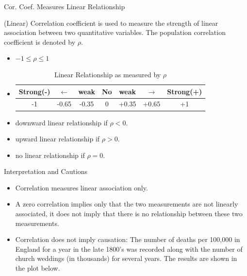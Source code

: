 \documentclass[14pt]{beamer}\usepackage[]{graphicx}\usepackage[]{color}
\begin{document}
\begin{frame}[fragile]{Cor. Coef. Measures Linear Relationship}

(Linear) Correlation coefficient is used to measure the strength of linear  association between two quantitative variables. The population correlation  coefficient is denoted by $\rho$.

\begin{itemize}
\item<1-> $ -1 \le \rho \le 1 $
\item<2-> 

\begin{table}[ht]
{\footnotesize{
\caption{Linear Relationship as measured by $\rho$}
\begin{tabular}{@{} ccccccc @{}} \hline
Strong(-) & $\leftarrow$ & weak & No & weak & $\rightarrow$ & Strong(+) \\ \hline
-1 & -0.65 & -0.35 & 0 & +0.35 & +0.65 & +1 \\ \hline
\end{tabular}
}}
\end{table}

\item<3-> downward linear relationship if $\rho < 0$.
\item<4-> upward linear relationship if $\rho > 0$. 
\item<5-> no linear relationship if $\rho = 0$. 
\end{itemize}
\end{frame}

\begin{frame}[fragile]{Interpretation and Cautions}

\begin{itemize}
\item<1-> Correlation measures linear association only.
\item<2-> A zero correlation implies only that the two measurements are not  linearly associated, it does not imply that there is no relationship  between these two measurements.
\item<3> Correlation does not imply causation: The number of deaths per  100,000 in England for a year in the late 1800's was recorded along  with the number of church weddings (in thousands) for several years.  The results are shown in the plot below.
\end{itemize}
\end{frame}
\end{document}
